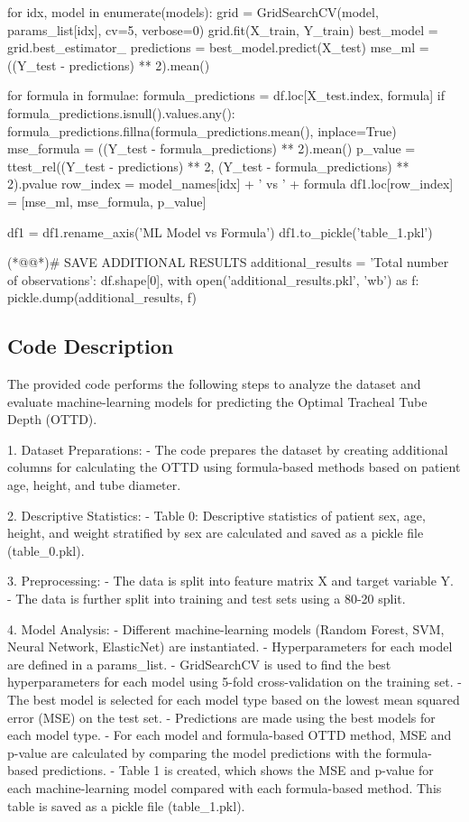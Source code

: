 \documentclass[11pt]{article}
\begin{document}
\begin{python}
for idx, model in enumerate(models):
    grid = GridSearchCV(model, params_list[idx], cv=5, verbose=0)      
    grid.fit(X_train, Y_train)
    best_model = grid.best_estimator_
    predictions = best_model.predict(X_test)
    mse_ml = ((Y_test - predictions) ** 2).mean()
    
    for formula in formulae:
        formula_predictions = df.loc[X_test.index, formula]
        if formula_predictions.isnull().values.any():
            formula_predictions.fillna(formula_predictions.mean(), inplace=True)
        mse_formula = ((Y_test - formula_predictions) ** 2).mean()
        p_value = ttest_rel((Y_test - predictions) ** 2, (Y_test - formula_predictions) ** 2).pvalue
        row_index = model_names[idx] + ' vs ' + formula
        df1.loc[row_index] = [mse_ml, mse_formula, p_value]

df1 = df1.rename_axis('ML Model vs Formula')
df1.to_pickle('table_1.pkl')

(*@@*)# SAVE ADDITIONAL RESULTS
additional_results = {
    'Total number of observations': df.shape[0],
}
with open('additional_results.pkl', 'wb') as f:
    pickle.dump(additional_results, f)


\end{python}

\subsection{Code Description}

The provided code performs the following steps to analyze the dataset and evaluate machine-learning models for predicting the Optimal Tracheal Tube Depth (OTTD).

1. Dataset Preparations:
   - The code prepares the dataset by creating additional columns for calculating the OTTD using formula-based methods based on patient age, height, and tube diameter.
   
2. Descriptive Statistics:
   - Table 0: Descriptive statistics of patient sex, age, height, and weight stratified by sex are calculated and saved as a pickle file (table\_0.pkl).

3. Preprocessing:
   - The data is split into feature matrix X and target variable Y.
   - The data is further split into training and test sets using a 80-20 split.

4. Model Analysis:
   - Different machine-learning models (Random Forest, SVM, Neural Network, ElasticNet) are instantiated.
   - Hyperparameters for each model are defined in a params\_list.
   - GridSearchCV is used to find the best hyperparameters for each model using 5-fold cross-validation on the training set.
   - The best model is selected for each model type based on the lowest mean squared error (MSE) on the test set.
   - Predictions are made using the best models for each model type.
   - For each model and formula-based OTTD method, MSE and p-value are calculated by comparing the model predictions with the formula-based predictions.
   - Table 1 is created, which shows the MSE and p-value for each machine-learning model compared with each formula-based method. This table is saved as a pickle file (table\_1.pkl).
\end{document}
